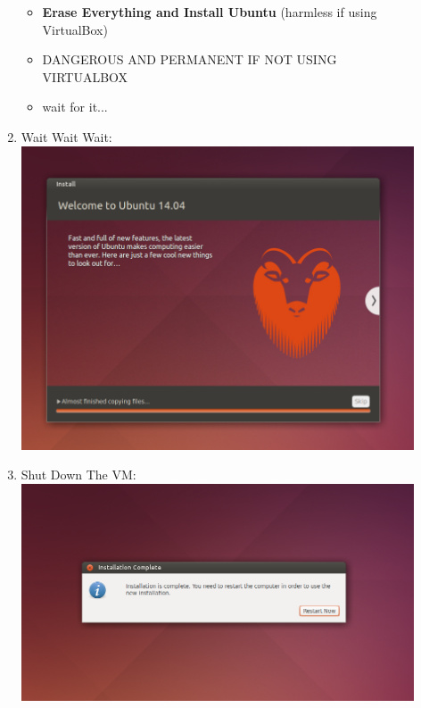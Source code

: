 \documentclass[12pt]{article}
\begin{document}
\begin{description}
\begin{enumerate}
\begin{itemize}
                 \item {\bf Erase Everything and Install Ubuntu} (harmless if using VirtualBox)
                 \item DANGEROUS AND PERMANENT IF NOT USING VIRTUALBOX
                 \item wait for it...    
            \end{itemize}
	\newpage
\item Wait Wait Wait: \vspace{20mm} \\
      		\includegraphics[scale=.6]{Capture13.png}
	\newpage
\item Shut Down The VM: \vspace{20mm} \\
      		\includegraphics[scale=.6]{Capture14.png}\\
			

\end{enumerate}
\end{description}
\end{document}
